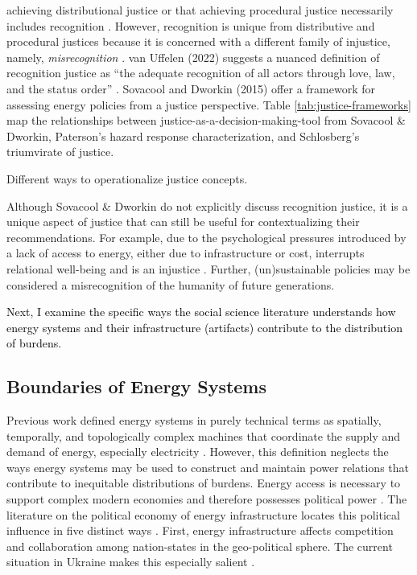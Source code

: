     achieving distributional justice or that achieving procedural justice
    necessarily includes recognition \cite{schlosberg_2_2007}. However,
    recognition is unique from distributive and procedural justices because it
    is concerned with a different family of injustice, namely,
    \textit{misrecognition} \cite{van_uffelen_revisiting_2022}. van Uffelen
    (2022) suggests a nuanced definition of recognition justice as ``the
    adequate recognition of all actors through love, law, and the status order''
    \cite{van_uffelen_revisiting_2022}.
Sovacool and Dworkin (2015) offer a framework for assessing energy policies from
a justice perspective. Table \ref{tab:justice-frameworks} map the relationships
between justice-as-a-decision-making-tool from Sovacool \& Dworkin, Paterson's
hazard response characterization, and Schlosberg's triumvirate of justice. 

\begin{table}[h]
    \centering
    \caption{Different ways to operationalize justice concepts.}
    
    \label{tab:justice-frameworks}
\end{table}

Although Sovacool \& Dworkin do not explicitly discuss recognition justice, it
is a unique aspect of justice that can still be useful for contextualizing their
recommendations. For example, due to the psychological pressures introduced by a
lack of access to energy, either due to infrastructure or cost, interrupts
relational well-being and is an injustice \cite{van_uffelen_revisiting_2022}.
Further, (un)sustainable policies may be considered a misrecognition of the
humanity of future generations.

\textcolor{black}{Next, I examine the specific ways the social science literature understands how energy systems and their infrastructure (artifacts) contribute to the distribution of burdens.}

\subsection{Boundaries of Energy Systems}
\label{section:energy-system-boundaries}
Previous work defined energy systems in purely technical terms as spatially,
temporally, and topologically complex machines that coordinate the supply and
demand of energy, especially electricity \cite{dotson_influence_2022}. However,
this definition neglects the ways energy systems may be used to construct and
maintain power relations that contribute to inequitable distributions of
burdens. Energy access is necessary to support complex modern economies and
therefore possesses political power \cite{jones_building_2013,
bridge_energy_2018}. The literature on the political economy of energy
infrastructure locates this political influence in five distinct ways
\cite{bridge_energy_2018}. First, energy infrastructure affects competition and
collaboration among nation-states in the geo-political sphere. The current
situation in Ukraine makes this especially salient
\cite{figueiredo_impacts_2022}. 


